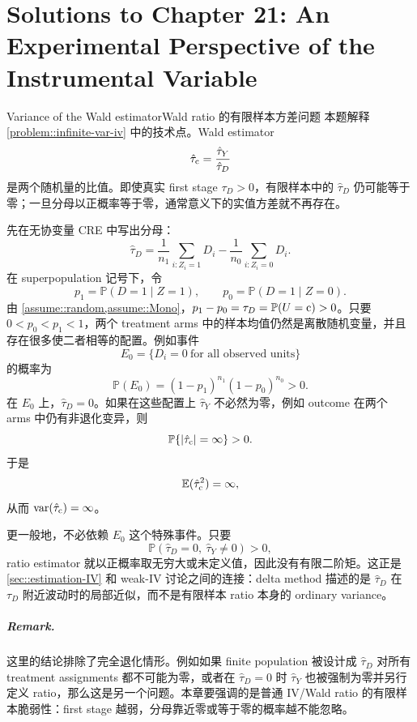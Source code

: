\chapter{Solutions to Chapter 21: An Experimental Perspective of the Instrumental Variable}
\label{sol:chapter21}

\begin{exercisesolution}{Variance of the Wald estimator}{Wald ratio 的有限样本方差问题}
本题解释 \cref{problem::infinite-var-iv} 中的技术点。Wald estimator
\[
\hat{\tau}_{\textup{c}}=\frac{\hat{\tau}_Y}{\hat{\tau}_D}
\]
是两个随机量的比值。即使真实 first stage $\tau_D>0$，有限样本中的 $\hat{\tau}_D$ 仍可能等于零；一旦分母以正概率等于零，通常意义下的实值方差就不再存在。

先在无协变量 CRE 中写出分母：
\[
\hat{\tau}_D
=
\frac{1}{n_1}\sum_{i:Z_i=1}D_i
-
\frac{1}{n_0}\sum_{i:Z_i=0}D_i.
\]
在 superpopulation 记号下，令
\[
p_1=\mathbb{P}(D=1\mid Z=1),\qquad
p_0=\mathbb{P}(D=1\mid Z=0).
\]
由 \cref{assume::random,assume::Mono}，$p_1-p_0=\tau_D=\mathbb{P}(U=\textup{c})>0$。只要 $0<p_0<p_1<1$，两个 treatment arms 中的样本均值仍然是离散随机变量，并且存在很多使二者相等的配置。例如事件
\[
E_0=\{D_i=0\ \text{for all observed units}\}
\]
的概率为
\[
\mathbb{P}(E_0)=(1-p_1)^{n_1}(1-p_0)^{n_0}>0.
\]
在 $E_0$ 上，$\hat{\tau}_D=0$。如果在这些配置上 $\hat{\tau}_Y$ 不必然为零，例如 outcome 在两个 arms 中仍有非退化变异，则
\[
\mathbb{P}\{|\hat{\tau}_{\textup{c}}|=\infty\}>0.
\]
于是
\[
\mathbb{E}(\hat{\tau}_{\textup{c}}^2)=\infty,
\]
从而 $\text{var}(\hat{\tau}_{\textup{c}})=\infty$。

更一般地，不必依赖 $E_0$ 这个特殊事件。只要
\[
\mathbb{P}(\hat{\tau}_D=0,\ \hat{\tau}_Y\neq 0)>0,
\]
ratio estimator 就以正概率取无穷大或未定义值，因此没有有限二阶矩。这正是 \cref{sec::estimation-IV} 和 weak-IV 讨论之间的连接：delta method 描述的是 $\hat{\tau}_D$ 在 $\tau_D$ 附近波动时的局部近似，而不是有限样本 ratio 本身的 ordinary variance。

\paragraph{Remark.}
这里的结论排除了完全退化情形。例如如果 finite population 被设计成 $\hat{\tau}_D$ 对所有 treatment assignments 都不可能为零，或者在 $\hat{\tau}_D=0$ 时 $\hat{\tau}_Y$ 也被强制为零并另行定义 ratio，那么这是另一个问题。本章要强调的是普通 IV/Wald ratio 的有限样本脆弱性：first stage 越弱，分母靠近零或等于零的概率越不能忽略。
\end{exercisesolution}

